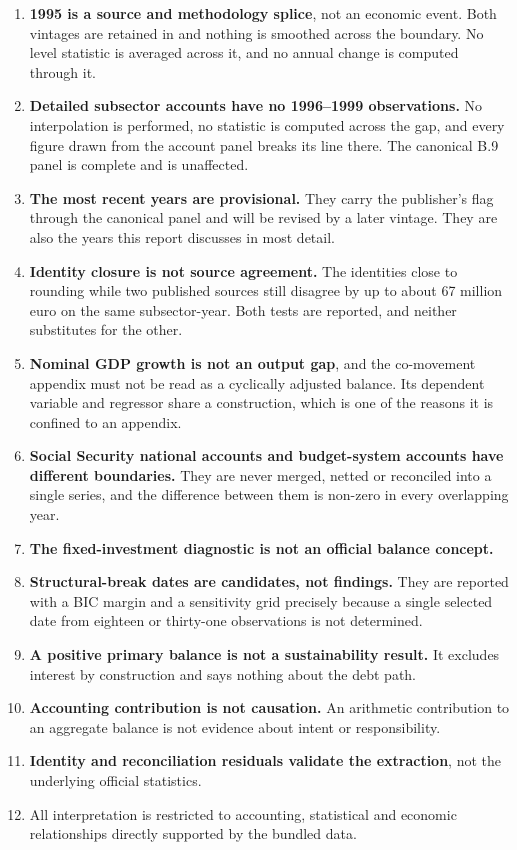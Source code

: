 \documentclass[11pt,a4paper]{article}
\begin{document}
\begin{enumerate}
\item \textbf{1995 is a source and methodology splice}, not an economic event. Both
vintages are retained in  and nothing is
smoothed across the boundary. No level statistic is averaged across it, and no annual change
is computed through it.
\item \textbf{Detailed subsector accounts have no 1996--1999 observations.} No
interpolation is performed, no statistic is computed across the gap, and every figure drawn
from the account panel breaks its line there. The canonical B.9 panel is complete and is
unaffected.
\item \textbf{The most recent years are provisional.} They carry the publisher's flag
through the canonical panel and will be revised by a later vintage. They are also the years
this report discusses in most detail.
\item \textbf{Identity closure is not source agreement.} The identities close to rounding
while two published sources still disagree by up to about 67 million euro on the same
subsector-year. Both tests are reported, and neither substitutes for the other.
\item \textbf{Nominal GDP growth is not an output gap}, and the co-movement appendix must
not be read as a cyclically adjusted balance. Its dependent variable and regressor share a
construction, which is one of the reasons it is confined to an appendix.
\item \textbf{Social Security national accounts and budget-system accounts have different
boundaries.} They are never merged, netted or reconciled into a single series, and the
difference between them is non-zero in every overlapping year.
\item \textbf{The fixed-investment diagnostic is not an official balance concept.}
\item \textbf{Structural-break dates are candidates, not findings.} They are reported with
a BIC margin and a sensitivity grid precisely because a single selected date from eighteen or
thirty-one observations is not determined.
\item \textbf{A positive primary balance is not a sustainability result.} It excludes
interest by construction and says nothing about the debt path.
\item \textbf{Accounting contribution is not causation.} An arithmetic contribution to an
aggregate balance is not evidence about intent or responsibility.
\item \textbf{Identity and reconciliation residuals validate the extraction}, not the
underlying official statistics.
\item All interpretation is restricted to accounting, statistical and economic
relationships directly supported by the bundled data.
\end{enumerate}
\end{document}
